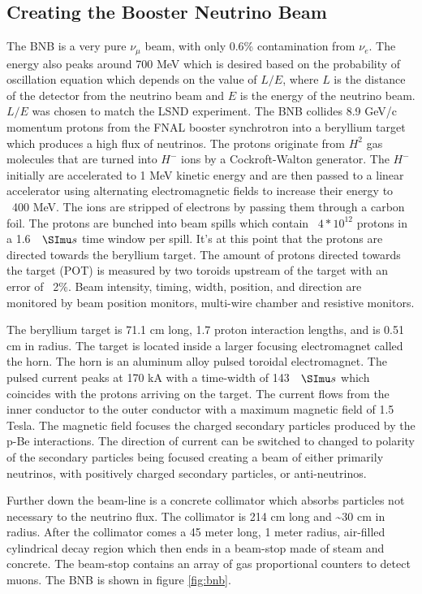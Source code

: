 \subsection{Creating the Booster Neutrino Beam}
The BNB is a very pure $\nu_{\mu}$ beam, with only 0.6\% contamination from $\nu_{e}$. The energy also peaks around 700 MeV which is desired based on the probability of oscillation equation which depends on the value of $L/E$, where $L$ is the distance of the detector from the neutrino beam and $E$ is the energy of the neutrino beam. $L/E$ was chosen to match the LSND experiment. The BNB collides 8.9 GeV/c momentum protons from the FNAL booster synchrotron into a beryllium target which produces a high flux of neutrinos. The protons originate from $H^2$ gas molecules that are turned into $H^-$ ions by a Cockroft-Walton generator. The $H^-$ initially are accelerated to 1 MeV kinetic energy and are then passed to a linear accelerator using alternating electromagnetic fields to increase their energy to ~400 MeV. The ions are stripped of electrons by passing them through a carbon foil. The protons are bunched into beam spills which contain ~$4*10^{12}$ protons in a 1.6 $\micro s$ time window per spill. 
It's at this point that the protons are directed towards the beryllium target. The amount of protons directed towards the target (POT) is measured by two toroids upstream of the target with an error of ~2$\%$. Beam intensity, timing, width, position, and direction are monitored by beam position monitors, multi-wire chamber and resistive monitors. 

The beryllium target is 71.1 cm long, 1.7 proton interaction lengths, and is 0.51 cm in radius. The target is located inside a larger focusing electromagnet called the horn. The horn is an aluminum alloy pulsed toroidal electromagnet. The pulsed current peaks at 170 kA with a time-width of 143 $\micro s$ which coincides with the protons arriving on the target. The current flows from the inner conductor to the outer conductor with a maximum magnetic field of 1.5 Tesla. The magnetic field focuses the charged secondary particles produced by the p-Be interactions. The direction of current can be switched to changed to polarity of the secondary particles being focused creating a beam of either primarily neutrinos, with positively charged secondary particles, or anti-neutrinos. 

Further down the beam-line is a concrete collimator which absorbs particles not necessary to the neutrino flux. The collimator is 214 cm long and \sim 30 cm in radius. After the collimator comes a 45 meter long, 1 meter radius, air-filled cylindrical decay region which then ends in a beam-stop made of steam and concrete. The beam-stop contains an array of gas proportional counters to detect muons. The BNB is shown in figure \ref{fig:bnb}.      

